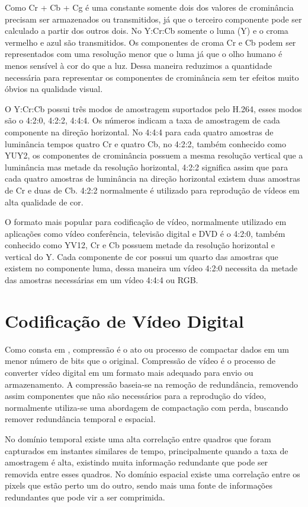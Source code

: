 Como Cr + Cb + Cg é uma constante somente dois dos valores de crominância precisam ser armazenados ou transmitidos, já que o terceiro componente pode ser calculado a partir dos outros dois. No Y:Cr:Cb somente o luma (Y) e o croma vermelho e azul são transmitidos. Os componentes de croma Cr e Cb podem ser representados com uma resolução menor que o luma já que o olho humano é menos sensível à cor do que a luz. Dessa maneira reduzimos a quantidade necessária para representar os componentes de crominância sem ter efeitos muito óbvios na qualidade visual.

O Y:Cr:Cb possui três modos de amostragem suportados pelo H.264, esses modos são o 4:2:0, 4:2:2, 4:4:4. Os números indicam a taxa de amostragem de cada componente na direção horizontal. No 4:4:4 para cada quatro amostras de luminância tempos quatro Cr e quatro Cb, no 4:2:2, também conhecido como YUY2, os componentes de crominância possuem a mesma resolução vertical que a luminância mas metade da resolução horizontal, 4:2:2 significa assim que para cada quatro amostras de luminância na direção horizontal existem duas amostras de Cr e duas de Cb. 4:2:2 normalmente é utilizado para reprodução de vídeos em alta qualidade de cor.

O formato mais popular para codificação de vídeo, normalmente utilizado em aplicações como vídeo conferência, televisão digital e DVD é o 4:2:0, também conhecido como YV12, Cr e Cb possuem metade da resolução horizontal e vertical do Y. Cada componente de cor possui um quarto das amostras que existem no componente luma, dessa maneira um vídeo 4:2:0 necessita da metade das amostras necessárias em um vídeo 4:4:4 ou RGB.

\section{Codificação de Vídeo Digital}

Como consta em \cite{h264avcs}, compressão é o ato ou processo de compactar dados em um menor número de bits que o original. Compressão de vídeo é o processo de converter vídeo digital em um formato mais adequado para envio ou armazenamento. A compressão baseia-se na remoção de redundância, removendo assim componentes que não são necessários para a reprodução do vídeo, normalmente utiliza-se uma abordagem de compactação com perda, buscando remover redundância temporal e espacial.

No domínio temporal existe uma alta correlação entre quadros que foram capturados em instantes similares de tempo, principalmente quando a taxa de amostragem é alta, existindo muita informação redundante que pode ser removida entre esses quadros. No domínio espacial existe uma correlação entre os pixels que estão perto um do outro, sendo mais uma fonte de informações redundantes que pode vir a ser comprimida.

